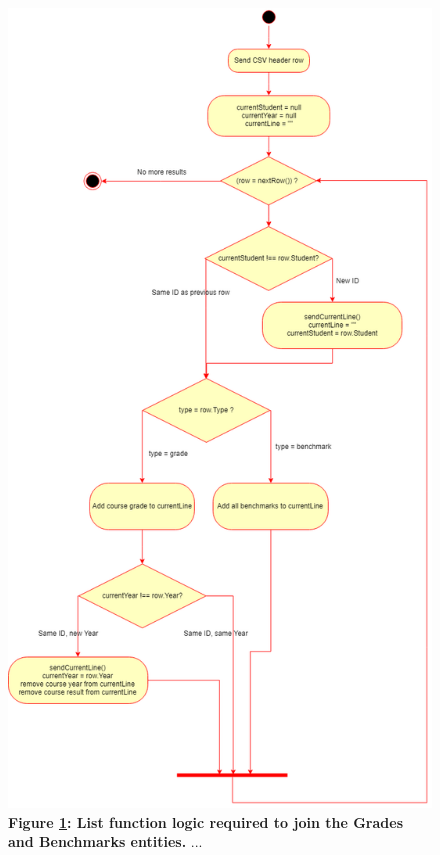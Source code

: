 \begin{figure}[ht]
    \centering
    \begin{mdframed}
        \centering
        \includegraphics[scale=0.35]{./resources/figures/2-way-join-list.png}
    \end{mdframed}
    \caption[2-Way Join List Function]{\textbf{Figure \ref{2-way-join-list-fn-diagram}: List function logic required to join the Grades and Benchmarks entities.} ...}
    \label{2-way-join-list-fn-diagram}
\end{figure}